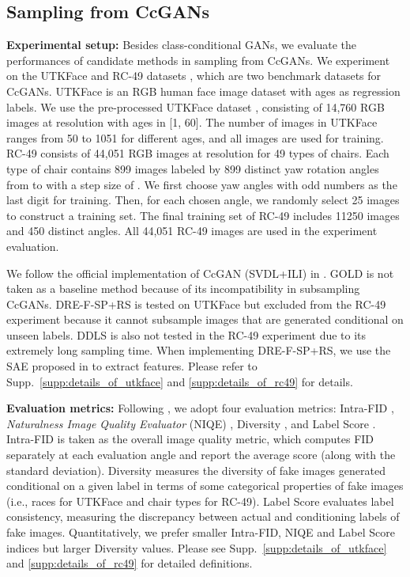 \documentclass[final,12pt, 3p,times]{elsarticle}
\begin{document}
\subsection{Sampling from CcGANs}\label{sec:experiment_regression}

{\setlength{\parindent}{0cm} \textbf{Experimental setup:}} Besides class-conditional GANs, we evaluate the performances of candidate methods in sampling from CcGANs. We experiment on the UTKFace \cite{utkface} and RC-49 datasets \cite{ding2021ccgan, ding2020continuous}, which are two benchmark datasets for CcGANs. UTKFace is an RGB human face image dataset with ages as regression labels. We use the pre-processed UTKFace dataset \cite{ding2021ccgan}, consisting of 14,760 RGB images at  resolution with ages in [1, 60]. The number of images in UTKFace ranges from 50 to 1051 for different ages, and all images are used for training. RC-49 consists of 44,051 RGB images at  resolution for 49 types of chairs. Each type of chair contains 899 images labeled by 899 distinct yaw rotation angles from  to  with a step size of . We first choose yaw angles with odd numbers as the last digit for training. Then, for each chosen angle, we randomly select 25 images to construct a training set. The final training set of RC-49 includes 11250 images and 450 distinct angles.  All 44,051 RC-49 images are used in the experiment evaluation.

We follow the official implementation of CcGAN (SVDL+ILI) in \cite{ding2021ccgan, ding2020continuous}. GOLD is not taken as a baseline method because of its incompatibility in subsampling CcGANs. DRE-F-SP+RS is tested on UTKFace but excluded from the RC-49 experiment because it cannot subsample images that are generated conditional on unseen labels. DDLS is also not tested in the RC-49 experiment due to its extremely long sampling time. When implementing DRE-F-SP+RS, we use the SAE proposed in  to extract features. Please refer to Supp.\ \ref{supp:details_of_utkface} and \ref{supp:details_of_rc49} for details. 


{\setlength{\parindent}{0cm} \textbf{Evaluation metrics:}}
Following \cite{ding2021ccgan, ding2020continuous}, we adopt four evaluation metrics: Intra-FID \cite{miyato2018cgans}, \textit{Naturalness Image Quality Evaluator} (NIQE) \cite{mittal2012making}, Diversity \cite{ding2021ccgan, ding2020continuous}, and Label Score \cite{ding2021ccgan, ding2020continuous}. Intra-FID is taken as the overall image quality metric, which computes FID separately at each evaluation angle and report the average score (along with the standard deviation). Diversity measures the diversity of fake images generated conditional on a given label in terms of some categorical properties of fake images (i.e., races for UTKFace and chair types for RC-49). Label Score evaluates label consistency, measuring the discrepancy between actual and conditioning labels of fake images. Quantitatively, we prefer smaller Intra-FID, NIQE and Label Score indices but larger Diversity values. Please see Supp.\ \ref{supp:details_of_utkface} and \ref{supp:details_of_rc49} for detailed definitions. 
\end{document}
